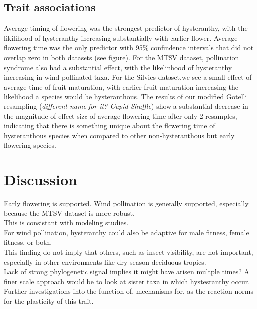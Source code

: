 \documentclass{article}\usepackage[]{graphicx}\usepackage[]{color}
\begin{document}
\subsection*{Trait associations}
Average timing of flowering was the strongest predictor of hysteranthy, with the likilihood of hysteranthy increasing substantially with earlier flower. Average flowering time was the only predictor with 95$\%$ confindence intervals that did not overlap zero in both datasets (see figure). For the MTSV dataset, pollination syndrome also had a substantial effect, with the likelinhood of hysteranthy increasing in wind pollinated taxa. For the Silvics dataset,we see a small effect of average time of fruit maturation, with earlier fruit maturation increasing the likelihood a species would be hysteranthous. The results of our modified Gotelli resampling (\textit{different name for it? Cupid Shuffle}) show a substantial decrease in the magnitude of effect size of average flowering time after only 2 resamples, indicating that there is something unique about the flowering time of hysteranthous species when compared to other non-hysteranthous but early flowering species.
\section*{Discussion}
Early flowering is supported. Wind pollination is generally supported, especially because the MTSV dataset is more robust.\\
This is consistant with modeling studies.\\ For wind pollination, hysteranthy could also be adaptive for male fitness, female fitness, or both.\\ This finding do not imply that others, such as insect visibility, are not important, especially in other environments like dry-season deciduous tropics.\\ Lack of strong phylogenetic signal implies it might have arisen multple times? A finer scale approach would be to look at sister taxa in which hystesranthy occur. \\ Further investigations into the function of, mechanisms for, as the reaction norms for the plasticity of this trait.\\ 
\end{document}
